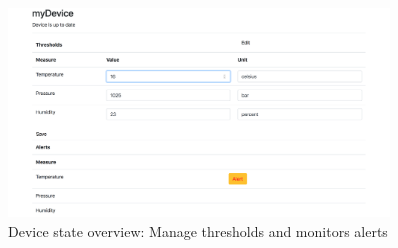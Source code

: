 \begin{figure}[H]
    \centering
    \includegraphics[width=0.9\textwidth]{figures/App/app_device_settings}
    \caption{Device state overview: Manage thresholds and monitors alerts}
    \label{fig:deviceoverview}
\end{figure}
